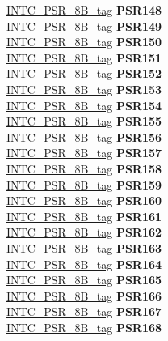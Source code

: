 \begin{DoxyCompactItemize}
\begin{tabbing}
\>\>\mbox{\hyperlink{unionINTC__PSR__8B__tag}{INTC\_PSR\_8B\_tag}} {\bfseries PSR148}\\
\>\>\mbox{\hyperlink{unionINTC__PSR__8B__tag}{INTC\_PSR\_8B\_tag}} {\bfseries PSR149}\\
\>\>\mbox{\hyperlink{unionINTC__PSR__8B__tag}{INTC\_PSR\_8B\_tag}} {\bfseries PSR150}\\
\>\>\mbox{\hyperlink{unionINTC__PSR__8B__tag}{INTC\_PSR\_8B\_tag}} {\bfseries PSR151}\\
\>\>\mbox{\hyperlink{unionINTC__PSR__8B__tag}{INTC\_PSR\_8B\_tag}} {\bfseries PSR152}\\
\>\>\mbox{\hyperlink{unionINTC__PSR__8B__tag}{INTC\_PSR\_8B\_tag}} {\bfseries PSR153}\\
\>\>\mbox{\hyperlink{unionINTC__PSR__8B__tag}{INTC\_PSR\_8B\_tag}} {\bfseries PSR154}\\
\>\>\mbox{\hyperlink{unionINTC__PSR__8B__tag}{INTC\_PSR\_8B\_tag}} {\bfseries PSR155}\\
\>\>\mbox{\hyperlink{unionINTC__PSR__8B__tag}{INTC\_PSR\_8B\_tag}} {\bfseries PSR156}\\
\>\>\mbox{\hyperlink{unionINTC__PSR__8B__tag}{INTC\_PSR\_8B\_tag}} {\bfseries PSR157}\\
\>\>\mbox{\hyperlink{unionINTC__PSR__8B__tag}{INTC\_PSR\_8B\_tag}} {\bfseries PSR158}\\
\>\>\mbox{\hyperlink{unionINTC__PSR__8B__tag}{INTC\_PSR\_8B\_tag}} {\bfseries PSR159}\\
\>\>\mbox{\hyperlink{unionINTC__PSR__8B__tag}{INTC\_PSR\_8B\_tag}} {\bfseries PSR160}\\
\>\>\mbox{\hyperlink{unionINTC__PSR__8B__tag}{INTC\_PSR\_8B\_tag}} {\bfseries PSR161}\\
\>\>\mbox{\hyperlink{unionINTC__PSR__8B__tag}{INTC\_PSR\_8B\_tag}} {\bfseries PSR162}\\
\>\>\mbox{\hyperlink{unionINTC__PSR__8B__tag}{INTC\_PSR\_8B\_tag}} {\bfseries PSR163}\\
\>\>\mbox{\hyperlink{unionINTC__PSR__8B__tag}{INTC\_PSR\_8B\_tag}} {\bfseries PSR164}\\
\>\>\mbox{\hyperlink{unionINTC__PSR__8B__tag}{INTC\_PSR\_8B\_tag}} {\bfseries PSR165}\\
\>\>\mbox{\hyperlink{unionINTC__PSR__8B__tag}{INTC\_PSR\_8B\_tag}} {\bfseries PSR166}\\
\>\>\mbox{\hyperlink{unionINTC__PSR__8B__tag}{INTC\_PSR\_8B\_tag}} {\bfseries PSR167}\\
\>\>\mbox{\hyperlink{unionINTC__PSR__8B__tag}{INTC\_PSR\_8B\_tag}} {\bfseries PSR168}\\

\end{tabbing}
\end{DoxyCompactItemize}
